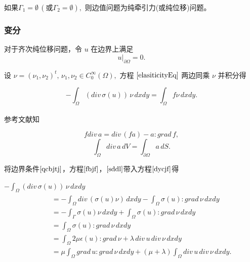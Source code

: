 \documentclass[a4paper,UTF8,titlepage,10pt]{ctexart}
\numberwithin{equation}{subsection}
\begin{document}
如果$\Gamma_1 = \emptyset \, (\mbox{或} \Gamma_2 = \emptyset),$ 则边值问题为纯牵引力(或纯位移)问题。

\subsubsection{变分}

对于齐次纯位移问题，令 $u$ 在边界上满足
\begin{equation}
u |_{\partial \Omega} = 0 .
\label{qcbjtj}
\end{equation}

设 $\nu = (\nu_1,\nu_2)^t, \, \nu_1, \nu_2 \in C_0^{\infty}(\Omega),$ 方程 $\eqref{elasiticityEq}$ 两边同乘 $\nu$ 并积分得

\begin{equation}
-\int_{\Omega} (div \, \sigma(u)) \, \nu \, dxdy = \int_{\Omega} f \nu \, dxdy .
\label{dycjf}
\end{equation}

参考文献知\textsuperscript{\cite{陈纪修2004数学分析}}

\begin{equation}
	f div \, a = div \, (fa) - a : grad \, f ,
\label{fbjf}
\end{equation}
\begin{equation}
	\int_{\Omega} div \, a \, dV = \int_{\partial \Omega} a \, dS .
\label{sddl}
\end{equation}

将边界条件$\eqref{qcbjtj}$，方程$\eqref{fbjf}$，$\eqref{sddl}$带入方程$\eqref{dycjf}$得

\par \quad \quad
$-\int_{\Omega} (div \, \sigma(u)) \, \nu \, dxdy$
$$ 
\quad \quad
\begin{matrix}
	\begin{aligned}
		&= -\int_{\Omega} div \, (\sigma(u) \nu) \, dxdy - \int_{\Omega} \sigma(u) : grad \, \nu \, dxdy \\
		&= -\int_{\Gamma} \sigma(u) \nu \, dxdy + \int_{\Omega} \sigma(u) : grad \, \nu \, dxdy \\
		&= \int_{\Omega} \sigma(u) : grad \, \nu \, dxdy \\
		&= \int_{\Omega} 2 \mu \epsilon(u) : grad \, \nu + \lambda \, div \, u \, div \, \nu \, dxdy  \\
		&= \mu \int_{\Omega} grad \, u : grad \, \nu \, dxdy + (\mu +\lambda) \int_{\Omega} div \, u \, div \, \nu \,  dxdy .
	\end{aligned}
\end{matrix}
$$
\end{document}
